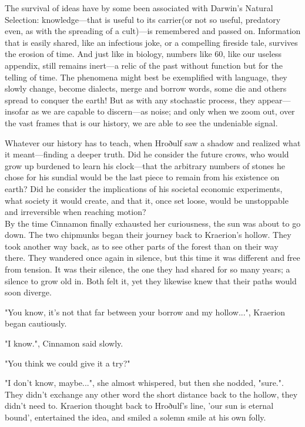 \renewcommand*{\thepage}{\footnotesize \arabic{page}}

The survival of ideas have by some been associated with Darwin's Natural Selection: knowledge---that is useful to its carrier(or not so useful, predatory even, as with the spreading of a cult)---is remembered and passed on. Information that is easily shared, like an infectious joke, or a compelling fireside tale, survives the erosion of time. And just like in biology, numbers like 60, like our useless appendix, still remains inert---a relic of the past without function but for the telling of time. The phenomena might best be exemplified with language, they slowly change, become dialects, merge and borrow words, some die and others spread to conquer the earth! But as with any stochastic process, they appear---insofar as we are capable to discern---as noise; and only when we zoom out, over the vast frames that is our history, we are able to see the undeniable signal.

Whatever our history has to teach, when Hroðulf saw a shadow and realized what it meant---finding a deeper truth. Did he consider the future crows, who would grow up burdened to learn his clock---that the arbitrary numbers of stones he chose for his sundial would be the last piece to remain from his existence on earth?
Did he consider the implications of his societal economic experiments, what society it would create, and that it, once set loose, would be unstoppable and irreversible when reaching motion?\\

By the time Cinnamon finally exhausted her curiousness, the sun was about to go down. The two chipmunks began their journey back to Kraerion's hollow. They took another way back, as to see other parts of the forest than on their way there. They wandered once again in silence, but this time it was different and free from tension. It was their silence, the one they had shared for so many years; a silence to grow old in. Both felt it, yet they likewise knew that their paths would soon diverge.

"You know, it's not that far between your borrow and my hollow...", Kraerion began cautiously.

"I know.", Cinnamon said slowly.

"You think we could give it a try?"

"I don't know, maybe...", she almost whispered, but then she nodded, "sure.". They didn't exchange any other word the short distance back to the hollow, they didn't need to. Kraerion thought back to Hroðulf's line, 'our sun is eternal bound', entertained the idea, and smiled a solemn smile at his own folly.

